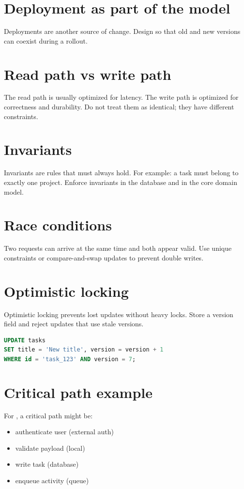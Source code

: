 \section{Deployment as part of the model}
Deployments are another source of change.
Design so that old and new versions can coexist during a rollout.

\section{Read path vs write path}
The read path is usually optimized for latency.
The write path is optimized for correctness and durability.
Do not treat them as identical; they have different constraints.

\section{Invariants}
Invariants are rules that must always hold.
For example: a task must belong to exactly one project.
Enforce invariants in the database and in the core domain model.

\section{Race conditions}
Two requests can arrive at the same time and both appear valid.
Use unique constraints or compare-and-swap updates to prevent double writes.

\section{Optimistic locking}
Optimistic locking prevents lost updates without heavy locks.
Store a version field and reject updates that use stale versions.

\begin{lstlisting}[language=SQL]
UPDATE tasks
SET title = 'New title', version = version + 1
WHERE id = 'task_123' AND version = 7;
\end{lstlisting}

\section{Critical path example}
For , a critical path might be:
\begin{itemize}[nosep]
  \item authenticate user (external auth)
  \item validate payload (local)
  \item write task (database)
  \item enqueue activity (queue)
\end{itemize}

